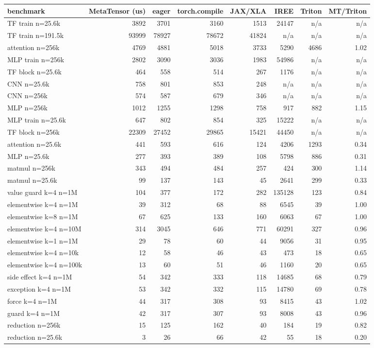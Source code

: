 \begin{tabular}{lrrrrrrr}
\toprule
benchmark & MetaTensor (us) & eager & torch.compile & JAX/XLA & IREE & Triton & MT/Triton \\
\midrule
TF train n=25.6k & 3892 & 3701 & 3160 & 1513 & 24147 & n/a & n/a \\
TF train n=191.5k & 93999 & 78927 & 78672 & 41824 & n/a & n/a & n/a \\
attention n=256k & 4769 & 4881 & 5018 & 3733 & 5290 & 4686 & 1.02 \\
MLP train n=256k & 2802 & 3090 & 3036 & 1983 & 54986 & n/a & n/a \\
TF block n=25.6k & 464 & 558 & 514 & 267 & 1176 & n/a & n/a \\
CNN n=25.6k & 758 & 801 & 853 & 248 & n/a & n/a & n/a \\
CNN n=256k & 574 & 587 & 679 & 346 & n/a & n/a & n/a \\
MLP n=256k & 1012 & 1255 & 1298 & 758 & 917 & 882 & 1.15 \\
MLP train n=25.6k & 647 & 802 & 854 & 325 & 15222 & n/a & n/a \\
TF block n=256k & 22309 & 27452 & 29865 & 15421 & 44450 & n/a & n/a \\
attention n=25.6k & 441 & 593 & 616 & 124 & 4206 & 1293 & 0.34 \\
MLP n=25.6k & 277 & 393 & 389 & 108 & 5798 & 886 & 0.31 \\
matmul n=256k & 343 & 494 & 484 & 257 & 424 & 300 & 1.14 \\
matmul n=25.6k & 99 & 137 & 143 & 45 & 2641 & 299 & 0.33 \\
value guard k=4 n=1M & 104 & 377 & 172 & 282 & 135128 & 123 & 0.84 \\
elementwise k=4 n=1M & 39 & 312 & 68 & 88 & 6545 & 39 & 1.00 \\
elementwise k=8 n=1M & 67 & 625 & 133 & 160 & 6063 & 67 & 1.00 \\
elementwise k=4 n=10M & 314 & 3045 & 646 & 771 & 60291 & 327 & 0.96 \\
elementwise k=1 n=1M & 29 & 78 & 60 & 44 & 9056 & 31 & 0.95 \\
elementwise k=4 n=10k & 12 & 58 & 46 & 43 & 473 & 18 & 0.65 \\
elementwise k=4 n=100k & 13 & 60 & 51 & 46 & 1160 & 20 & 0.65 \\
side effect k=4 n=1M & 54 & 342 & 333 & 118 & 14685 & 68 & 0.79 \\
exception k=4 n=1M & 53 & 342 & 332 & 115 & 14780 & 69 & 0.78 \\
force k=4 n=1M & 44 & 317 & 308 & 93 & 8415 & 43 & 1.02 \\
guard k=4 n=1M & 42 & 317 & 307 & 93 & 8008 & 43 & 0.96 \\
reduction n=256k & 15 & 125 & 162 & 40 & 184 & 19 & 0.82 \\
reduction n=25.6k & 3 & 26 & 66 & 42 & 55 & 18 & 0.20 \\
\bottomrule
\end{tabular}
